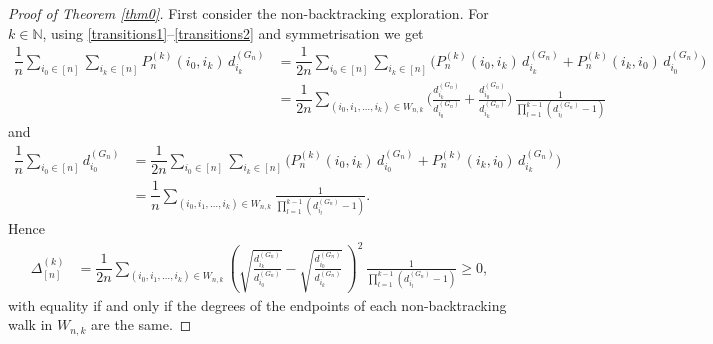 \documentclass[11pt]{article}
\numberwithin{equation}{section}
\theoremstyle{plain}
\newcommand{\N}{\mathbb N}
\newcommand{\dn}{d^{(G_{n})}}
\begin{document}
\begin{proof}[Proof of Theorem \ref{thm0}]
First consider the non-backtracking exploration. For $k\in\N$, using \eqref{transitions1}--\eqref{transitions2} and symmetrisation we get
\begin{align*}
\dfrac{1}{n}\sum_{i_{0}\in [n]}\sum_{i_{k}\in [n]} P_{n}^{(k)}(i_{0},i_{k}) \,\dn_{i_{k}} 
&=\dfrac{1}{2n}\sum_{i_{0}\in [n]}\sum_{i_{k}\in [n]}\Big(P_{n}^{(k)}(i_{0},i_{k})\,
\dn_{i_{k}}+P_{n}^{(k)}(i_{k},i_{0})\,\dn_{i_{0}}\Big)\\
&=\dfrac{1}{2n}\sum_{(i_{0},i_{1},\ldots ,i_{k})\in W_{n,k}}\bigg(\frac{\dn_{i_{k}}}{\dn_{i_{0}}}
+\frac{\dn_{i_{0}}}{\dn_{i_{k}}}\bigg)\,\frac{1}{\prod_{l=1}^{k-1}(\dn_{i_{l}}-1)}
\end{align*}
and
\begin{align*}
\dfrac{1}{n}\sum_{i_{0}\in [n]} \dn_{i_{0}}
&=\dfrac{1}{2n}\sum_{i_{0}\in [n]}\sum_{i_{k}\in [n]}\Big(P_{n}^{(k)}(i_{0},i_{k})\,\dn_{i_{0}}
+P_{n}^{(k)}(i_{k},i_{0})\,\dn_{i_{k}}\Big)\\
&=\dfrac{1}{n}\sum_{(i_{0},i_{1},\ldots ,i_{k})\in W_{n,k}}\frac{1}{\prod_{l=1}^{k-1}(\dn_{i_{l}}-1)}.
\end{align*}
Hence
\begin{align*}
\Delta_{[n]}^{(k)} &=\dfrac{1}{2n}\sum_{(i_{0},i_{1},\ldots ,i_{k})\in W_{n,k}}\left(\sqrt{\frac{\dn_{i_{k}}}{\dn_{i_{0}}}}
-\sqrt{\frac{\dn_{i_{0}}}{\dn_{i_{k}}}}\,\right)^{2}\,\frac{1}{\prod_{l=1}^{k-1}(\dn_{i_{l}}-1)}\geq 0,
\end{align*}
with equality if and only if the degrees of the endpoints of each non-backtracking walk in $W_{n,k}$ are the same. 


\end{proof}
\end{document}
